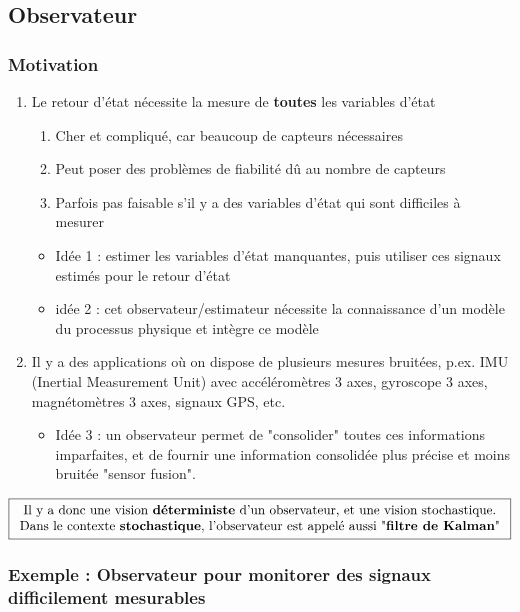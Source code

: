 \documentclass[document.tex]{subfiles}
\begin{document}
\subsection{Observateur}

\subsubsection{Motivation}

\begin{enumerate}
\item Le retour d'état nécessite la mesure de \textbf{toutes} les variables d'état
\begin{enumerate}
\item Cher et compliqué, car beaucoup de capteurs nécessaires
\item Peut poser des problèmes de fiabilité dû au nombre de capteurs
\item Parfois pas faisable s'il y a des variables d'état qui sont difficiles à mesurer
\end{enumerate}
\begin{itemize}
\item Idée 1 : estimer les variables d'état manquantes, puis utiliser ces signaux estimés pour le retour d'état
\item idée 2 : cet observateur/estimateur nécessite la connaissance d'un modèle du processus physique et intègre ce modèle
\end{itemize}
\item Il y a des applications où on dispose de plusieurs mesures bruitées, p.ex. IMU (Inertial Measurement Unit) avec accéléromètres 3 axes, gyroscope 3 axes, magnétomètres 3 axes, signaux GPS, etc.
\begin{itemize}
\item Idée 3 : un observateur permet de "consolider" toutes ces informations imparfaites, et de fournir une information consolidée plus précise et moins bruitée "sensor fusion".
\end{itemize}
\end{enumerate}

$$\boxed{\begin{array}{c}
\text{Il y a donc une vision \textbf{déterministe} d'un observateur, et une vision stochastique.}\\ \text{Dans le contexte \textbf{stochastique}, l'observateur est appelé aussi "\textbf{filtre de Kalman}"}
\end{array}}$$

\subsubsection{Exemple : Observateur pour monitorer des signaux difficilement mesurables}
\end{document}
